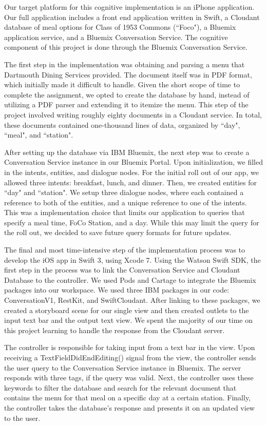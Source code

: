 \documentclass [12pt] {article}
\begin{document}
Our target platform for this cognitive implementation is an iPhone application. Our full application includes a front end application written in Swift, a Cloudant database of meal options for Class of 1953 Commons (``Foco"), a Bluemix application service, and a Bluemix Conversation Service. The cognitive component of this project is done through the Bluemix Conversation Service.

The first step in the implementation was obtaining and parsing a menu that Dartmouth Dining Services provided. The document itself was in PDF format, which initially made it difficult to handle. Given the short scope of time to complete the assignment, we opted to create the database by hand, instead of utilizing a PDF parser and extending it to itemize the menu. This step of the project involved writing roughly eighty documents in a Cloudant service. In total, these documents contained one-thousand lines of data, organized by ``day", ``meal", and ``station".

After setting up the database via IBM Bluemix, the next step was to create a Conversation Service instance in our Bluemix Portal. Upon initialization, we filled in the intents, entities, and dialogue nodes. For the initial roll out of our app, we allowed three intents: breakfast, lunch, and dinner. Then, we created entities for ``day" and ``station". We setup three dialogue nodes, where each contained a reference to both of the entities, and a unique reference to one of the intents. This was a implementation choice that limits our application to queries that specify a meal time, FoCo Station, and a day. While this may limit the query for the roll out, we decided to save future query formats for future updates.

The final and most time-intensive step of the implementation process was to develop the iOS app in Swift 3, using Xcode 7. Using the Watson Swift SDK, the first step in the process was to link the Conversation Service and Cloudant Database to the controller. We used Pods and Cartage to integrate the Bluemix packages into our workspace. We used three IBM packages in our code: ConversationV1, RestKit, and SwiftCloudant. After linking to these packages, we created a storyboard scene for our single view and then created outlets to the input text bar and the output text view. We spent the majority of our time on this project learning to handle the response from the Cloudant server.


 The controller is responsible for taking input from a text bar in the view. Upon receiving a TextFieldDidEndEditing() signal from the view, the controller sends the user query to the Conversation Service instance in Bluemix. The server responds with three tags, if the query was valid. Next, the controller uses these keywords to filter the database and search for the relevant document that contains the menu for that meal on a specific day at a certain station. Finally, the controller takes the database's response and presents it on an updated view to the user.
 
\end{document}

